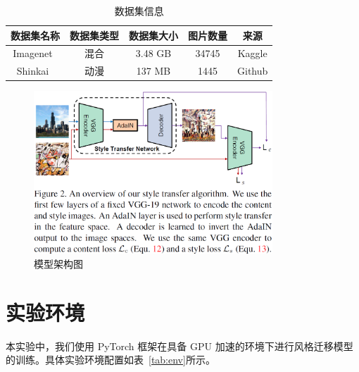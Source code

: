 \documentclass[UTF8,openany]{ctexbook}
\begin{document}
\begin{table}[H]
    \centering
    \caption{数据集信息}
    \label{tab:dataset}
    \begin{tabular}{ccccc}
        \toprule
        数据集名称 & 数据集类型 & 数据集大小 & 图片数量 & 来源 \\ \midrule
        Imagenet~\cite{deng2009imagenet}  & 混合 & 3.48 GB & 34745 & Kaggle   \\
        Shinkai~\cite{Liu2024dtgan}  & 动漫 & 137 MB & 1445 & Github  \\ \bottomrule
    \end{tabular}
\end{table}

\begin{figure}[ht!]
    \centering
    \includegraphics[width=0.8\textwidth]{1.png}
    \caption{模型架构图\cite{huang2017arbitrary}}
    \label{fig:model}
\end{figure}

\section{实验环境}
\label{sec:env}

本实验中，我们使用 PyTorch 框架在具备 GPU 加速的环境下进行风格迁移模型的训练。具体实验环境配置如表~\ref{tab:env}所示。
\end{document}
